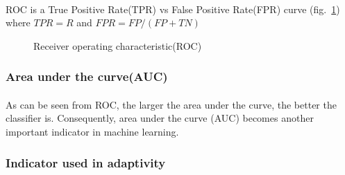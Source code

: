 \paragraph{}
ROC is a True Positive Rate(TPR) vs False Positive Rate(FPR) curve (fig.~\ref{adap_fig:svm_roc}) where $TPR=R$ and $FPR=FP/(FP+TN)$
\begin{figure}[h!]
    \centering
    \caption{Receiver operating characteristic(ROC)}
    \label{adap_fig:svm_roc}
\end{figure}

\subsubsection{Area under the curve(AUC)}
\paragraph{}
As can be seen from ROC, the larger the area under the curve, the better the classifier is.
Consequently, area under the curve (AUC) becomes another important indicator in machine learning.

\subsubsection{Indicator used in adaptivity}
